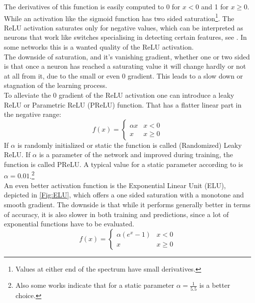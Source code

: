 				The derivatives of this function is easily computed to 0 for $ x < 0$ and 1 for $ x \geq 0$. While an activation like the sigmoid function has two sided saturation\footnote{Values at either end of the spectrum have small derivatives.}. The ReLU activation saturates only for negative values, which can be interpreted as neurons that work like switches specialising in detecting certain features, see \cite{VanGrad}. In some networks this is a wanted quality of the ReLU activation.\\
				The downside of saturation, and it's vanishing gradient, whether one or two sided is that once a neuron has reached a saturating value it will change hardly or not at all from it, due to the small or even 0 gradient. This leads to a slow down or stagnation of the learning process.\\
				To alleviate the 0 gradient of the ReLU activation one can introduce a leaky ReLU or Parametric ReLU (PReLU) function. That has a flatter linear part in the negative range:
				\begin{equation}
					f(x) =
					\begin{cases}
						\alpha x & x < 0\\
						x & x \geq 0
					\end{cases}
					\label{EQ:PReLU}
				\end{equation}
				If $\alpha$ is randomly initialized or static the function is called (Randomized) Leaky ReLU. If $\alpha$ is a parameter of the network and improved during training, the function is called PReLU. A typical value for a static parameter according to \cite{VanGrad} is $\alpha = 0.01$.\footnote{Also some works indicate that for a static parameter $\alpha = \frac{1}{5.5}$ is a better choice.}\\
				An even better activation function is the Exponential Linear Unit (ELU), depicted in \ref{Fig:ELU}, which offers a one sided saturation with a monotone and smooth gradient. The downside is that while it performs generally better in terms of accuracy, it is also slower in both training and predictions, since a lot of exponential functions have to be evaluated.\\
				\begin{equation}
				f(x) =
					\begin{cases}
						\alpha (e^x - 1) & x < 0 \\
						x & x \geq 0
					\end{cases}
				\end{equation}
